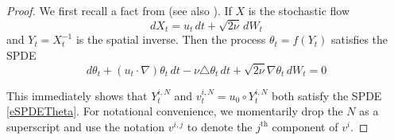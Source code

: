 \documentclass[final]{amsart}%
\newcommand{\lap}{\triangle}
\newcommand{\inv}{^{-1}}
\newcommand{\grad}{\nabla}
\numberwithin{equation}{section}
\theoremstyle{definition}
\theoremstyle{remark}
\begin{document}
\begin{proof}%
  We first recall a fact from \cites{detsns,thesis} (see also
  \cite{krylov-rosovski}). If $X$ is the stochastic flow
$$
dX_t = u_t\, dt + \sqrt{2\nu} \,dW_t
$$
and $Y_t = X_t \inv$ is the spatial inverse. Then the process $\theta_t
= f(Y_t)$ satisfies the SPDE
\begin{equation}\label{eSPDETheta}
  d\theta_t + (u_t \cdot \grad) \theta_t \, dt - \nu \lap \theta_t \,
  dt + \sqrt{2 \nu} \grad \theta_t \, dW_t = 0 
\end{equation}

This immediately shows that $Y^{i,N}_t$ and $v^{i,N}_t = u_0 \circ
Y^{i,N}_t$ both satisfy the SPDE \eqref{eSPDETheta}. For notational
convenience, we momentarily drop the $N$ as a superscript and use the
notation $v^{i,j}$ to denote the $j^\text{th}$ component of $v^i$.


\end{proof}
\end{document}
